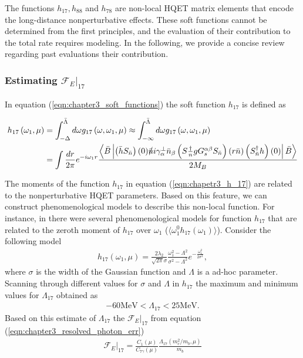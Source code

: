 The functions $h_{17}, h_{88}$ and $h_{78}$ are non-local HQET matrix elements that encode the long-distance nonperturbative effects\cite{Benzke:2010js}. These soft functions cannot be determined from the first principles, and the evaluation of their contribution to the total rate requires modeling. In the following, we provide a concise review regarding past evaluations their contribution. 
\vspace{-0.4cm}
\subsubsection{Estimating $\mathcal{F}_E|_{17}$}\label{sec:Q1Q7_cont}
\vspace{-0.2cm}
In equation (\ref{eqn:chapter3_soft_functions}) the soft function $h_{17}$ is defined as

\begin{eqnarray}\label{eqn:chapetr3_h_17}
\begin{aligned}
h_{17}\left(\omega_{1}, \mu\right) &=\int_{-\Delta}^{\bar{\Lambda}} d \omega g_{17}\left(\omega, \omega_{1}, \mu\right) \approx \int_{-\infty}^{\bar{\Lambda}} d \omega g_{17}\left(\omega, \omega_{1}, \mu\right) \\
&=\int \frac{d r}{2 \pi} e^{-i \omega_{1} r} \frac{\left\langle\bar{B}\left|\left(\bar{h} S_{\bar{n}}\right)(0) \slashed{\bar{n}} i \gamma_{\alpha}^{\perp} \bar{n}_{\beta}\left(S \frac{\dagger}{n} g G_{s}^{\alpha \beta} S_{\bar{n}}\right)(r \bar{n})\left(S_{\bar{n}}^{\dagger} h\right)(0)\right| \bar{B}\right\rangle}{2 M_{B}}
\end{aligned}
\end{eqnarray} 
\vspace{0.1cm}

The moments of the function $h_{17}$ in equation (\ref{eqn:chapetr3_h_17}) are related to the nonperturbative HQET parameters. Based on this feature, we can construct phenomenological models to describe this non-local function. For instance, in \cite{Benzke:2010js} there were several phenomenological models for function $h_{17}$ that are related to the zeroth moment of $h_{17}$ over $\omega_1$ ($\langle \omega_1^0 h_{17}(\omega_1)\rangle$). Consider the following model
\begin{eqnarray}\label{eqn:chapter3_old_model}
h_{17}\left(\omega_{1}, \mu\right)=\frac{2 \lambda_{2}}{\sqrt{2 \pi} \sigma} \frac{\omega_{1}^{2}-\Lambda^{2}}{\sigma^{2}-\Lambda^{2}} e^{-\frac{\omega_{1}^{2}}{2 \sigma^{2}}},
\end{eqnarray}
where $\sigma$ is the width of the Gaussian function and $\Lambda$ is a ad-hoc parameter. Scanning through different values for $\sigma$ and $\Lambda$ in $h_{17}$ the maximum and minimum values for $\Lambda_{17} $ obtained as \cite{Benzke:2010js}
\begin{eqnarray}
-60 \mathrm{MeV}<\Lambda_{17}<25 \mathrm{MeV}.
\end{eqnarray} 
Based on this estimate of $\Lambda_{17}$ the $\mathcal{F}_E|_{17}$ from equation (\ref{eqn:chapter3_resolved_photon_err})
\begin{eqnarray}
\mathcal{F}_E|_{17}=\frac{C_{1}(\mu)}{C_{7 \gamma}(\mu)} \frac{\Lambda_{17}\left(m_{c}^{2} / m_{b}, \mu\right)}{m_{b}}
\end{eqnarray}
